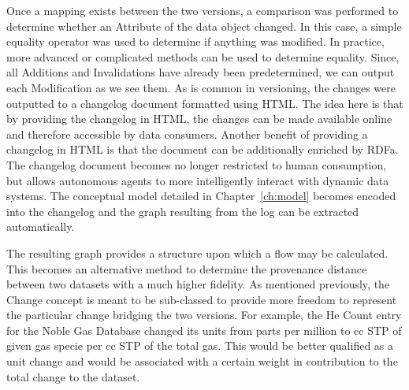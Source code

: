 Once a mapping exists between the two versions, a comparison was performed to determine whether an Attribute of the data object changed.  In this case, a simple equality operator was used to determine if anything was modified.  In practice, more advanced or complicated methods can be used to determine equality.  Since, all Additions and Invalidations have already been predetermined, we can output each Modification as we see them.  As is common in versioning, the changes were outputted to a changelog document formatted using HTML.  The idea here is that by providing the changelog in HTML, the changes can be made available online and therefore accessible by data consumers.  Another benefit of providing a changelog in HTML is that the document can be additionally enriched by RDFa.  The changelog document becomes no longer restricted to human consumption, but allows autonomous agents to more intelligently interact with dynamic data systems.  The conceptual model detailed in Chapter~\ref{ch:model} becomes encoded into the changelog and the graph resulting from the log can be extracted automatically.

The resulting graph provides a structure upon which a flow may be calculated.  This becomes an alternative method to determine the provenance distance between two datasets with a much higher fidelity.  As mentioned previously, the Change concept is meant to be sub-classed to provide more freedom to represent the particular change bridging the two versions.  For example, the He Count entry for the Noble Gas Database changed its units from parts per million to cc STP of given gas specie per cc STP of the total gas.  This would be better qualified as a unit change and would be associated with a certain weight in contribution to the total change to the dataset.